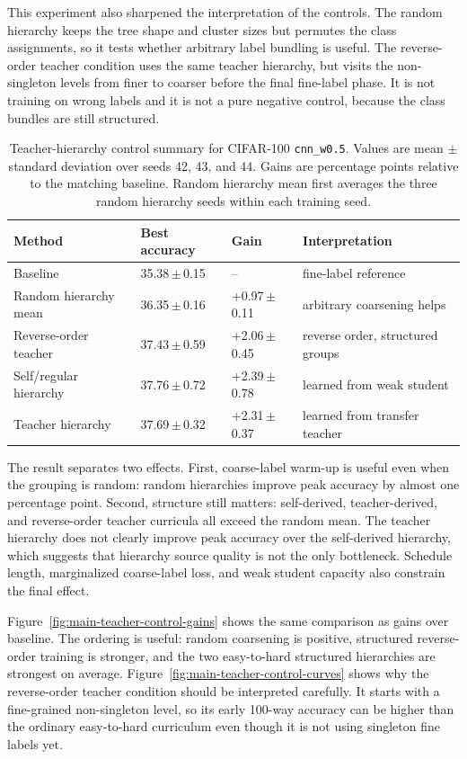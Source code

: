 \documentclass[english,master,a4paper,oneside]{ppfcmthesis}
\begin{document}
This experiment also sharpened the interpretation of the controls. The random
hierarchy keeps the tree shape and cluster sizes but permutes the class
assignments, so it tests whether arbitrary label bundling is useful. The
reverse-order teacher condition uses the same teacher hierarchy, but visits the
non-singleton levels from finer to coarser before the final fine-label phase. It
is not training on wrong labels and it is not a pure negative control, because
the class bundles are still structured.

\begin{table}[htbp]
\centering
\scriptsize
\begin{tabular}{llll}
\toprule
Method & Best accuracy & Gain & Interpretation \\
\midrule
Baseline & 35.38\,$\pm$\,0.15 & -- & fine-label reference \\
Random hierarchy mean & 36.35\,$\pm$\,0.16 & +0.97\,$\pm$\,0.11 & arbitrary coarsening helps \\
Reverse-order teacher & 37.43\,$\pm$\,0.59 & +2.06\,$\pm$\,0.45 & reverse order, structured groups \\
Self/regular hierarchy & 37.76\,$\pm$\,0.72 & +2.39\,$\pm$\,0.78 & learned from weak student \\
Teacher hierarchy & 37.69\,$\pm$\,0.32 & +2.31\,$\pm$\,0.37 & learned from transfer teacher \\
\bottomrule
\end{tabular}
\caption{Teacher-hierarchy control summary for CIFAR-100 \texttt{cnn\_w0.5}.
Values are mean $\pm$ standard deviation over seeds 42, 43, and 44. Gains are
percentage points relative to the matching baseline. Random hierarchy mean first
averages the three random hierarchy seeds within each training seed.}
\label{tab:main-teacher-hierarchy-controls}
\end{table}

The result separates two effects. First, coarse-label warm-up is useful even
when the grouping is random: random hierarchies improve peak accuracy by almost
one percentage point. Second, structure still matters: self-derived,
teacher-derived, and reverse-order teacher curricula all exceed the random mean.
The teacher hierarchy does not clearly improve peak accuracy over the
self-derived hierarchy, which suggests that hierarchy source quality is not the
only bottleneck. Schedule length, marginalized coarse-label loss, and weak
student capacity also constrain the final effect.

Figure~\ref{fig:main-teacher-control-gains} shows the same comparison as gains
over baseline. The ordering is useful: random coarsening is positive, structured
reverse-order training is stronger, and the two easy-to-hard structured
hierarchies are strongest on average. Figure~\ref{fig:main-teacher-control-curves}
shows why the reverse-order teacher condition should be interpreted carefully.
It starts with a fine-grained non-singleton level, so its early 100-way accuracy
can be higher than the ordinary easy-to-hard curriculum even though it is not
using singleton fine labels yet.
\end{document}
